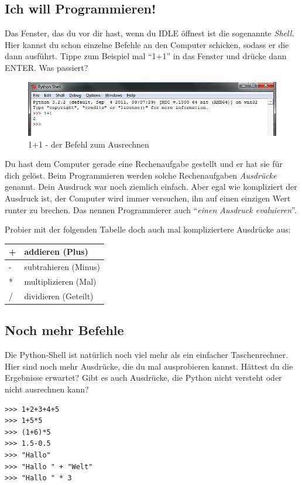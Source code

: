 	\subsection*{Ich will Programmieren!}
	Das Fenster, das du vor dir hast, wenn du IDLE öffnest ist die sogenannte \emph{Shell}. Hier kannst du schon einzelne Befehle an den Computer schicken, sodass er die dann ausführt. Tippe zum Beispiel mal \enquote{1+1} in das Fenster und drücke dann ENTER. Was passiert?
	
	\begin{figure}[htbp]
		\centering
		\includegraphics[width=1\textwidth]{img/1plus1.jpg}
		\caption{1+1 - der Befehl zum Ausrechnen}
		\label{1plus1}
	\end{figure}
	
	Du hast dem Computer gerade eine Rechenaufgabe gestellt und er hat sie für dich gelöst. Beim Programmieren werden solche Rechenaufgaben \emph{Ausdrücke} genannt. Dein Ausdruck war noch ziemlich einfach. Aber egal wie kompliziert der Ausdruck ist, der Computer wird immer versuchen, ihn auf einen einzigen Wert runter zu brechen. Das nennen Programmierer auch \enquote{\emph{einen Ausdruck evaluieren}}. 
	
	Probier mit der folgenden Tabelle doch auch mal kompliziertere Ausdrücke aus:
	\begin{table}[htbp]
		\centering
		\normalsize
		\begin{tabular}{|l|l|}
			\hline
				+ & 	addieren (Plus)	\\
			\hline
				- & 	subtrahieren (Minus)\\
			\hline
				* & 	multiplizieren (Mal)\\
			\hline
				/ & 	dividieren (Geteilt)\\
			\hline
		\end{tabular}
	\end{table}
	
	\subsection*{Noch mehr Befehle}
	Die Python-Shell ist natürlich noch viel mehr als ein einfacher Taschenrechner. Hier sind noch mehr Ausdrücke, die du mal ausprobieren kannst. Hättest du die Ergebnisse erwartet? Gibt es auch Ausdrücke, die Python nicht versteht oder nicht ausrechnen kann?
	
	\begin{lstlisting}
>>> 1+2+3+4+5
>>> 1+5*5
>>> (1+6)*5
>>> 1.5-0.5
>>> "Hallo"
>>> "Hallo " + "Welt"
>>> "Hallo " * 3
	\end{lstlisting}
	
